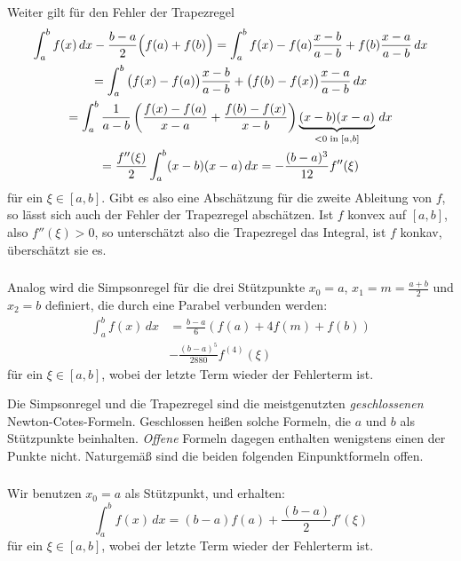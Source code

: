 \noindent Weiter gilt für den Fehler der Trapezregel
\begin{multline}
  \int_a^b f(x)\, dx - \frac{b-a}{2} \Bigl(f(a) + f(b)\Bigr)
  =  \int_a^b f(x) - f(a)\frac{x-b}{a-b}
  + f(b)\frac{x-a}{a-b}\, dx\\
  =  \int_a^b
  {}\bigl(f(x) - f(a)\bigr)\frac{x-b}{a-b}
  + \bigl(f(b) - f(x)\bigr)\frac{x-a}{a-b}\, dx\\
  =  \int_a^b
  \frac{1}{a-b}\left(\frac{f(x) - f(a)}{x-a} + \frac{f(b) - f(x)}{x-b}\right)
  \underbrace{(x-b)(x-a)}_{<0\;\text{in}\;[a,b]}\, dx\\
  =
  \frac{f''(\xi)}{2}\int_a^b (x-b)(x-a)\, dx = -\frac{(b-a)^3}{12} f''(\xi)
\end{multline}
für ein $\xi\in[a,b]$. Gibt es also eine Abschätzung für die zweite
Ableitung von $f$, so lässt sich auch der Fehler der Trapezregel
abschätzen. Ist $f$ konvex auf $[a,b]$, also $f''(\xi)>0$, so
unterschätzt also die Trapezregel das Integral, ist $f$ konkav,
überschätzt sie es.

\subsubsection{}
\begin{minipage}{0.74\linewidth}
  Analog wird die Simpsonregel für die drei Stützpunkte $x_0=a$,
  $x_1=m=\frac{a+b}{2}$ und $x_2=b$ definiert, die durch eine Parabel
  verbunden werden:
  \begin{align}
    \int_a^b f(x)\, dx &= \frac{b-a}{6} \left(f(a) +
      4 f\left(m\right) + f(b)\right)\nonumber\\
    &-\frac{(b-a)^5}{2880} f^{(4)}(\xi)
  \end{align}
  für ein $\xi\in[a,b]$, wobei der letzte Term wieder der Fehlerterm ist.
\end{minipage}

Die Simpsonregel und die Trapezregel sind die meistgenutzten
\emph{geschlossenen} Newton-Cotes-Formeln. Geschlossen heißen solche
Formeln, die $a$ und $b$ als Stützpunkte beinhalten. \emph{Offene}
Formeln dagegen enthalten wenigstens einen der Punkte
nicht. Naturgemäß sind die beiden folgenden Einpunktformeln offen.

\subsubsection{}
\begin{minipage}[t]{0.74\linewidth}
  Wir benutzen $x_0=a$ als Stützpunkt, und erhalten:
  \begin{equation}
    \int_a^b f(x)\, dx = (b-a) f(a) +
    \frac{(b-a)}{2} f'(\xi)
  \end{equation}
  für ein $\xi\in[a,b]$, wobei der letzte Term wieder der Fehlerterm ist.
\end{minipage}

